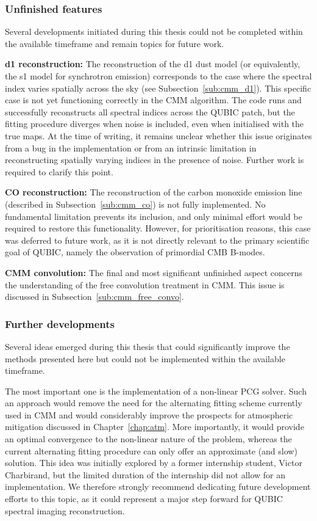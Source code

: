 \documentclass[../../thesis.tex]{subfiles}
\begin{document}
\subsubsection{Unfinished features}

Several developments initiated during this thesis could not be completed within the available timeframe and remain topics for future work.

\textbf{d1 reconstruction:} The reconstruction of the d1 dust model (or equivalently, the s1 model for synchrotron emission) corresponds to the case where the spectral index varies spatially across the sky (see Subsection~\ref{sub:cmm_d1}). This specific case is not yet functioning correctly in the CMM algorithm. The code runs and successfully reconstructs all spectral indices across the QUBIC patch, but the fitting procedure diverges when noise is included, even when initialised with the true maps. At the time of writing, it remains unclear whether this issue originates from a bug in the implementation or from an intrinsic limitation in reconstructing spatially varying indices in the presence of noise. Further work is required to clarify this point.

\textbf{CO reconstruction:} The reconstruction of the carbon monoxide emission line (described in Subsection~\ref{sub:cmm_co}) is not fully implemented. No fundamental limitation prevents its inclusion, and only minimal effort would be required to restore this functionality. However, for prioritisation reasons, this case was deferred to future work, as it is not directly relevant to the primary scientific goal of QUBIC, namely the observation of primordial CMB B-modes.

\textbf{CMM convolution:} The final and most significant unfinished aspect concerns the understanding of the free convolution treatment in CMM. This issue is discussed in Subsection~\ref{sub:cmm_free_convo}.

\subsubsection{Further developments}

Several ideas emerged during this thesis that could significantly improve the methods presented here but could not be implemented within the available timeframe.

The most important one is the implementation of a non-linear PCG solver. Such an approach would remove the need for the alternating fitting scheme currently used in CMM and would considerably improve the prospects for atmospheric mitigation discussed in Chapter~\ref{chap:atm}. More importantly, it would provide an optimal convergence to the non-linear nature of the problem, whereas the current alternating fitting procedure can only offer an approximate (and slow) solution. This idea was initially explored by a former internship student, Victor Charbirand, but the limited duration of the internship did not allow for an implementation. We therefore strongly recommend dedicating future development efforts to this topic, as it could represent a major step forward for QUBIC spectral imaging reconstruction.
\end{document}
